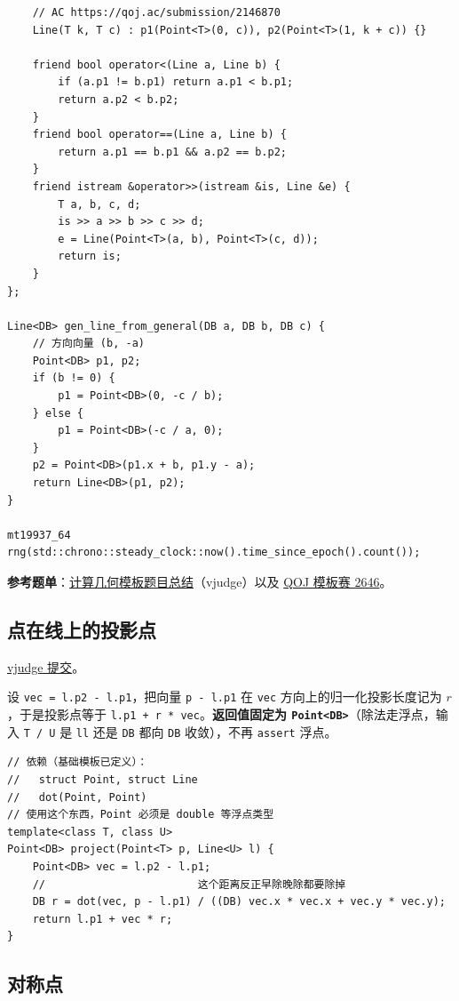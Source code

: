 \begin{verbatim}
	// AC https://qoj.ac/submission/2146870
	Line(T k, T c) : p1(Point<T>(0, c)), p2(Point<T>(1, k + c)) {}

	friend bool operator<(Line a, Line b) {
		if (a.p1 != b.p1) return a.p1 < b.p1;
		return a.p2 < b.p2;
	}
	friend bool operator==(Line a, Line b) {
		return a.p1 == b.p1 && a.p2 == b.p2;
	}
	friend istream &operator>>(istream &is, Line &e) {
		T a, b, c, d;
		is >> a >> b >> c >> d;
		e = Line(Point<T>(a, b), Point<T>(c, d));
		return is;
	}
};

Line<DB> gen_line_from_general(DB a, DB b, DB c) {
	// 方向向量 (b, -a)
	Point<DB> p1, p2;
	if (b != 0) {
		p1 = Point<DB>(0, -c / b);
	} else {
		p1 = Point<DB>(-c / a, 0);
	}
	p2 = Point<DB>(p1.x + b, p1.y - a);
	return Line<DB>(p1, p2);
}

mt19937_64 rng(std::chrono::steady_clock::now().time_since_epoch().count());
		\end{verbatim}

		\textbf{参考题单}：\href{https://vjudge.net/article/12247}{计算几何模板题目总结}（vjudge）以及 \href{https://qoj.ac/contest/2646}{QOJ 模板赛 2646}。

		\subsection{点在线上的投影点}

		\href{https://vjudge.net/solution/64166651}{vjudge 提交}。

		设 \texttt{vec = l.p2 - l.p1}，把向量 \texttt{p - l.p1} 在 \texttt{vec} 方向上的归一化投影长度记为 $r$，于是投影点等于 \texttt{l.p1 + r * vec}。\textbf{返回值固定为 \texttt{Point<DB>}}（除法走浮点，输入 \texttt{T / U} 是 \texttt{ll} 还是 \texttt{DB} 都向 \texttt{DB} 收敛），不再 \texttt{assert} 浮点。

		\begin{verbatim}
// 依赖（基础模板已定义）：
//   struct Point, struct Line
//   dot(Point, Point)
// 使用这个东西，Point 必须是 double 等浮点类型
template<class T, class U>
Point<DB> project(Point<T> p, Line<U> l) {
	Point<DB> vec = l.p2 - l.p1;
	//                        这个距离反正早除晚除都要除掉
	DB r = dot(vec, p - l.p1) / ((DB) vec.x * vec.x + vec.y * vec.y);
	return l.p1 + vec * r;
}
		\end{verbatim}

		\subsection{对称点}

